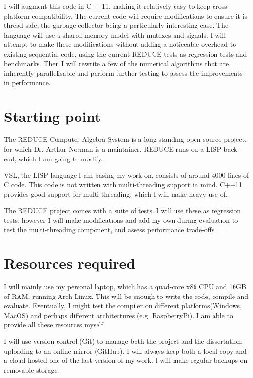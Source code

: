 \documentclass[12pt,a4paper,twoside]{article}
\begin{document}
	I will augment this code in C++11,  making it
	relatively easy to keep cross-platform compatibility. The current
	code will require modifications to ensure it is thread-safe,
	the garbage collector being a particularly interesting case.
	The language will use a shared memory model with mutexes and signals.
	I will attempt to make these modifications without adding a
	noticeable overhead to existing sequential code, using the current
	REDUCE tests as regression tests and benchmarks. Then I will rewrite
	a few of the numerical algorithms that are inherently parallelisable
	and perform further testing to assess the improvements in performance.
	
	\section*{Starting point}
	
	The REDUCE Computer Algebra System 
	is a long-standing open-source
	project, for which Dr. Arthur Norman is a maintainer. REDUCE runs on a
	LISP back-end, which I am going to modify.
	
	VSL,  the LISP language I am basing my work on, consists of around 4000 lines of
	C code. This code is not written with multi-threading support in mind. C++11 provides good support for multi-threading, which I will make heavy use of.
	
	The REDUCE project comes with a suite of tests. I will use these as regression tests,
	however I will make modifications and add my own during evaluation to test
	the multi-threading component, and assess performance trade-offs.
	
	\section*{Resources required}
	
	I will mainly use my personal laptop, which has a quad-core x86 CPU
	and 16GB of RAM, running Arch Linux. This will be enough to write the code, compile and evaluate.
	Eventually, I might test the compiler on different platforms(Windows, MacOS) and perhaps
	different architectures (e.g. RaspberryPi). I am able to provide all these resources myself. 
	
	I will use version control (Git) to manage both the project and the dissertation, uploading
	to an online mirror (GitHub). I will always keep both a local copy and a cloud-hosted one of the 
	last version of my work. I will make regular backups on removable storage.
	
\end{document}
